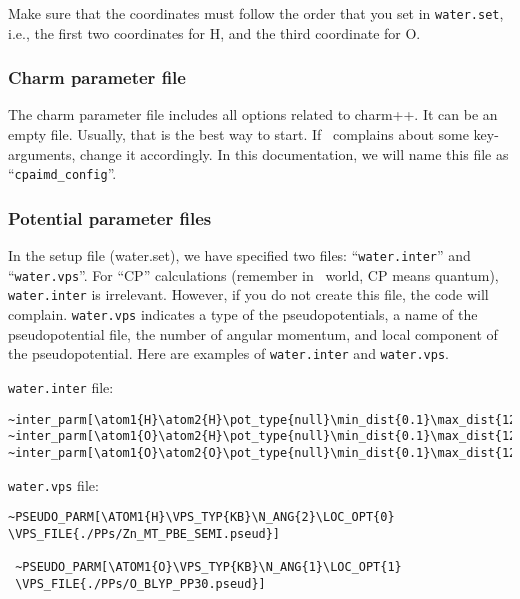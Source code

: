Make sure that the coordinates must follow the order that you set in \verb+water.set+, i.e., the first two coordinates for H, and the third coordinate for O. 

\subsubsection{Charm parameter file}

The charm parameter file includes all options related to charm++. It can be an empty file. Usually, that is the best way to start. If  \openatom \ complains about some key-arguments, change it accordingly. In this documentation, we will name this file as ``\verb+cpaimd_config+''.


\subsubsection{Potential parameter files}

In the setup file (water.set), we have specified two files: ``\verb+water.inter+'' and ``\verb+water.vps+''. For ``CP'' calculations (remember in \openatom \ world, CP means quantum), \verb+water.inter+ is irrelevant. However, if you do not create this file, the code will complain. \verb+water.vps+ indicates a type of the pseudopotentials, a name of the pseudopotential file, the number of angular momentum, and local component of the pseudopotential. Here are examples of \verb+water.inter+ and \verb+water.vps+.

\verb+water.inter+ file:

\begin{verbatim}
~inter_parm[\atom1{H}\atom2{H}\pot_type{null}\min_dist{0.1}\max_dist{12.9}]
~inter_parm[\atom1{O}\atom2{H}\pot_type{null}\min_dist{0.1}\max_dist{12.9}]
~inter_parm[\atom1{O}\atom2{O}\pot_type{null}\min_dist{0.1}\max_dist{12.9}]
\end{verbatim}

\verb+water.vps+ file:

\begin{verbatim}
~PSEUDO_PARM[\ATOM1{H}\VPS_TYP{KB}\N_ANG{2}\LOC_OPT{0}
\VPS_FILE{./PPs/Zn_MT_PBE_SEMI.pseud}]

 ~PSEUDO_PARM[\ATOM1{O}\VPS_TYP{KB}\N_ANG{1}\LOC_OPT{1}
 \VPS_FILE{./PPs/O_BLYP_PP30.pseud}]

\end{verbatim}

